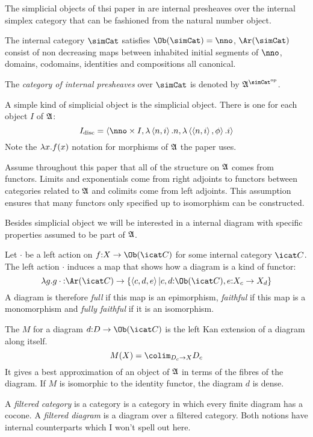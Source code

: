 \documentclass[csh.tex]{subfiles}
\begin{document}
The simplicial objects of thsi paper in are internal presheaves over the 
internal simplex category that can be fashioned from the natural number object.

\begin{definition} The internal category $\simCat$ satisfies 
  $\Ob(\simCat)=\nno$, $\Ar(\simCat)$ consist of non decreasing maps between
inhabited initial segments of $\nno$, domains, codomains, identities and 
compositions all canonical.

The \emph{category of internal presheaves} over $\simCat$ is denoted by
 $\ambient\s$.
\end{definition}

\begin{example} A simple kind of simplicial object is the  
  simplicial object. There is one for each object $I$ of $\mathfrak A$: 
\[ I\disc = \tuplet{\nno\times I,\function{\tuplet{n,i}}n,\function{\tuplet{\tuplet{n,i},\phi}}i} \]
Note the $\lambda x .{f(x)}$ notation for morphisms of $\mathfrak A$ the paper 
uses.
\end{example}

\begin{remark} Assume throughout this paper that all of the structure on 
  $\mathfrak A$ comes from functors. Limits and exponentials come from right
   adjoints to functors between categories related to $\mathfrak A$ and colimits 
   come from left adjoints. This assumption ensures that many functors only 
   specified up to isomorphism can be constructed.
\end{remark}


Besides simplicial object we will be interested in a internal diagram
with specific properties assumed to be part of $\mathfrak A$.

\begin{definition}
  Let $\cdot$ be a left action on $f\of X\to \Ob(\icat C)$ for some internal
  category $\icat C$. The left action $\cdot$ induces a map that shows how a
  diagram is a kind of functor:
  \[ \function g g\cdot\of\Ar(\icat C)\to\set{\tuplet{c,d,e}| c,d\of\Ob(\icat C), e\of X_c\to X_d} \]
  A diagram is therefore \emph{full} if this map is an epimorphism, 
  \emph{faithful} if this map is a monomorphism and \emph{fully faithful} if it
  is an isomorphism.

  The  $M$ for a diagram $d\of D\to\Ob(\icat C)$ is the 
  left Kan extension of a diagram along itself. 
  \[M(X) = \colim_{D_c\to X} D_c\]
  It gives a best approximation of an object of $\mathfrak A$ in terms of the 
  fibres of the diagram. If $M$ is isomorphic to the identity functor, the
  diagram $d$ is dense. %

  A \emph{filtered category} is a category is a category in which every 
  finite diagram has a cocone. A \emph{filtered diagram} is a diagram over a
  filtered category. Both notions have internal counterparts which I won't spell
  out here.
\end{definition}
\end{document}
